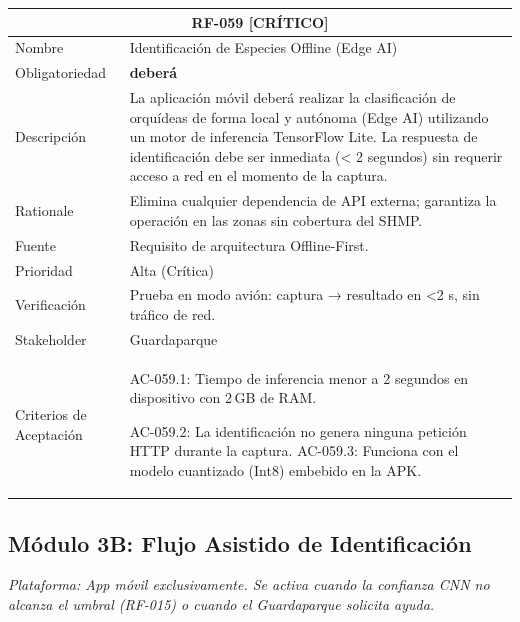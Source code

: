 \documentclass[12pt, a4paper]{article}
\newcommand{\criticomark}{\textcolor{criticolor}{\textbf{[CR\'ITICO]}}}
\begin{document}
\begin{longtable}{|p{3cm}|p{11.5cm}|}
\hline
\multicolumn{2}{|c|}{\textbf{RF-059} \criticomark} \\
\hline
Nombre & Identificación de Especies Offline (Edge AI) \\
\hline
Obligatoriedad & \textbf{deberá} \\
\hline
Descripción & La aplicación móvil deberá realizar la clasificación de orquídeas de forma local y autónoma (Edge AI) utilizando un motor de inferencia TensorFlow Lite. La respuesta de identificación debe ser inmediata (< 2 segundos) sin requerir acceso a red en el momento de la captura. \\
\hline
Rationale & Elimina cualquier dependencia de API externa; garantiza la operación en las zonas sin cobertura del SHMP. \\
\hline
Fuente & Requisito de arquitectura Offline-First. \\
\hline
Prioridad & Alta (Crítica) \\
\hline
Verificación & Prueba en modo avión: captura → resultado en <2 s, sin tráfico de red. \\
\hline
Stakeholder & Guardaparque \\
\hline
Criterios de Aceptación & AC-059.1: Tiempo de inferencia menor a 2 segundos en dispositivo con 2 GB de RAM. \newline

AC-059.2: La identificación no genera ninguna petición HTTP durante la captura. \newline
AC-059.3: Funciona con el modelo cuantizado (Int8) embebido en la APK. \\
\hline
\end{longtable}

\subsection{M\'odulo 3B: Flujo Asistido de Identificaci\'on}

\textit{Plataforma: App m\'ovil exclusivamente. Se activa cuando la confianza CNN no alcanza el umbral (RF-015) o cuando el Guardaparque solicita ayuda.}
\end{document}
